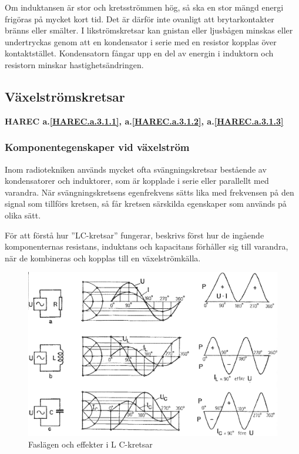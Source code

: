 Om induktansen är stor och kretsströmmen hög, så ska en stor mängd energi
frigöras på mycket kort tid.
Det är därför inte ovanligt att brytarkontakter bränns eller smälter.
I likströmskretsar kan gnistan eller ljusbågen minskas eller undertryckas genom
att en kondensator i serie med en resistor kopplas över kontaktstället.
Kondensatorn fångar upp en del av energin i induktorn och resistorn minskar
hastighetsändringen.

\subsection{Växelströmskretsar}
\textbf{HAREC a.\ref{HAREC.a.3.1.1}\label{myHAREC.a.3.1.1h}, a.\ref{HAREC.a.3.1.2}\label{myHAREC.a.3.1.2b}, a.\ref{HAREC.a.3.1.3}\label{myHAREC.a.3.1.3b}}

\subsubsection{Komponentegenskaper vid växelström}

Inom radiotekniken används mycket ofta svängningskretsar bestående av
kondensatorer och induktorer, som är kopplade i serie eller parallellt med
varandra.
När svängningskretsens egenfrekvens sätts lika med frekvensen på den signal som
tillförs kretsen, så får kretsen särskilda egenskaper som används på olika sätt.

För att förstå hur ''LC-kretsar'' fungerar, beskrivs först hur de ingående
komponenternas resistans, induktans och kapacitans förhåller sig till varandra,
när de kombineras och kopplas till en växelströmkälla.

\begin{figure}
\includegraphics[width=\textwidth]{images/cropped_pdfs/bild_2_3-11.pdf}
\caption{Faslägen och effekter i L C-kretsar}
\label{fig:BildII3-11}
\end{figure}

